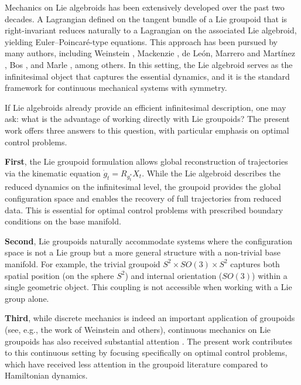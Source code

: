 \documentclass{article}
\begin{document}

Mechanics on Lie algebroids has been extensively developed over the past two decades. A Lagrangian defined on the tangent bundle of a Lie groupoid that is right-invariant reduces naturally to a Lagrangian on the associated Lie algebroid, yielding Euler--Poincar\'e-type equations. This approach has been pursued by many authors, including Weinstein \cite{Wei}, Mackenzie \cite{Mack}, de León, Marrero and Martínez \cite{LeMarMar}, Bos \cite{Bos}, and Marle \cite{Marle}, among others. In this setting, the Lie algebroid serves as the infinitesimal object that captures the essential dynamics, and it is the standard framework for continuous mechanical systems with symmetry.


If Lie algebroids already provide an efficient infinitesimal description, one may ask: what is the advantage of working directly with Lie groupoids? The present work offers three answers to this question, with particular emphasis on optimal control problems.

\textbf{First}, the Lie groupoid formulation allows global reconstruction of trajectories via the kinematic equation $\dot{g}_t = R_{g_t^*}X_t$. While the Lie algebroid describes the reduced dynamics on the infinitesimal level, the groupoid provides the global configuration space and enables the recovery of full trajectories from reduced data. This is essential for optimal control problems with prescribed boundary conditions on the base manifold.

\textbf{Second}, Lie groupoids naturally accommodate systems where the configuration space is not a Lie group but a more general structure with a non-trivial base manifold. For example, the trivial groupoid $S^2 \times SO(3) \times S^2$ captures both spatial position (on the sphere $S^2$) and internal orientation ($SO(3)$) within a single geometric object. This coupling is not accessible when working with a Lie group alone.

\textbf{Third}, while discrete mechanics is indeed an important application of groupoids (see, e.g., the work of Weinstein and others), continuous mechanics on Lie groupoids has also received substantial attention \cite{Bos, HA2}. The present work contributes to this continuous setting by focusing specifically on optimal control problems, which have received less attention in the groupoid literature compared to Hamiltonian dynamics.
\end{document}
